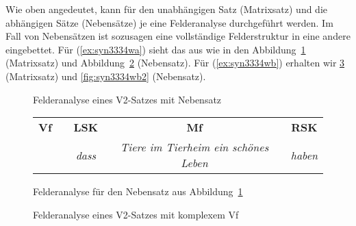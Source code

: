 \begin{exe}
  \ex\label{ex:saetze1426}
  \begin{xlist}
  \end{xlist}
\end{exe}

Wie oben angedeutet, kann für den unabhängigen Satz (Matrixsatz) und die abhängigen Sätze (Nebensätze) je eine Felderanalyse durchgeführt werden.
Im Fall von Nebensätzen ist sozusagen eine vollständige Felderstruktur in eine andere eingebettet.
Für (\ref{ex:syn3334wa}) sieht das aus wie in den Abbildung~\ref{fig:syn3334wa1} (Matrixsatz) und Abbildung~\ref{fig:syn3334wa2} (Nebensatz).
Für (\ref{ex:syn3334wb}) erhalten wir \ref{fig:syn3334wb1} (Matrixsatz) und \ref{fig:syn3334wb2} (Nebensatz).

\begin{figure}
  \centering
  \caption{Felderanalyse eines V2-Satzes mit Nebensatz}
  \label{fig:syn3334wa1}
\end{figure}

\begin{figure}
  \centering
  \begin{tabular}{cp{0.1em}cp{0.1em}cp{0.1em}c}
    \textbf{Vf} && \textbf{LSK} && \textbf{Mf} && \textbf{RSK} \\
    \cmidrule{1-1}\cmidrule{3-3}\cmidrule{5-5}\cmidrule{7-7}
    && \textit{dass} && \textit{Tiere im Tierheim ein schönes Leben} && \textit{haben} \\
  \end{tabular}
  \caption{Felderanalyse für den Nebensatz aus Abbildung~\ref{fig:syn3334wa1}}
  \label{fig:syn3334wa2}
\end{figure}

\begin{figure}
  \centering
  \caption{Felderanalyse eines V2-Satzes mit komplexem Vf}
  \label{fig:syn3334wb1}
\end{figure}

